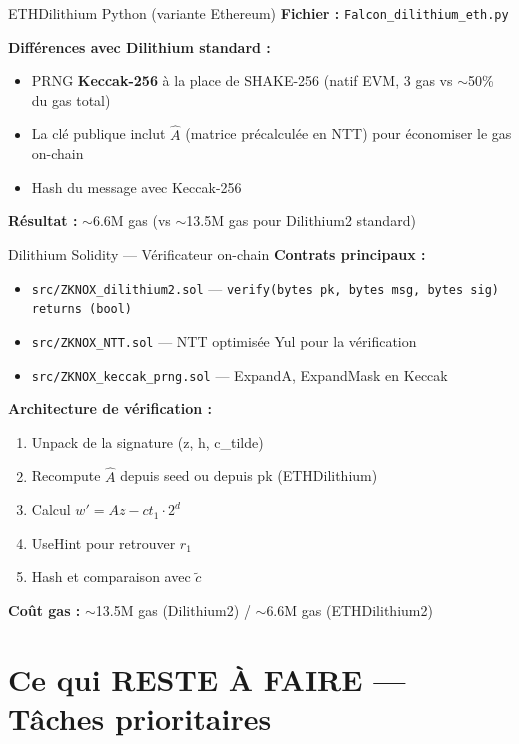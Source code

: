 \documentclass[12pt, a4paper]{article}
\begin{document}
\begin{done}{ETHDilithium Python (variante Ethereum)}
\textbf{Fichier :} \texttt{Falcon\_dilithium\_eth.py}

\textbf{Différences avec Dilithium standard :}
\begin{itemize}
  \item PRNG \textbf{Keccak-256} à la place de SHAKE-256 (natif EVM, 3 gas vs $\sim$50\% du gas total)
  \item La clé publique inclut $\hat{A}$ (matrice précalculée en NTT) pour économiser le gas on-chain
  \item Hash du message avec Keccak-256
\end{itemize}
\textbf{Résultat :} $\sim$6.6M gas (vs $\sim$13.5M gas pour Dilithium2 standard)
\end{done}

\begin{done}{Dilithium Solidity --- Vérificateur on-chain}
\textbf{Contrats principaux :}
\begin{itemize}
  \item \texttt{src/ZKNOX\_dilithium2.sol} --- \texttt{verify(bytes pk, bytes msg, bytes sig) returns (bool)}
  \item \texttt{src/ZKNOX\_NTT.sol} --- NTT optimisée Yul pour la vérification
  \item \texttt{src/ZKNOX\_keccak\_prng.sol} --- ExpandA, ExpandMask en Keccak
\end{itemize}
\textbf{Architecture de vérification :}
\begin{enumerate}
  \item Unpack de la signature (z, h, c\_tilde)
  \item Recompute $\hat{A}$ depuis seed ou depuis pk (ETHDilithium)
  \item Calcul $w' = Az - ct_1 \cdot 2^d$
  \item UseHint pour retrouver $r_1$
  \item Hash et comparaison avec $\tilde{c}$
\end{enumerate}
\textbf{Coût gas :} $\sim$13.5M gas (Dilithium2) / $\sim$6.6M gas (ETHDilithium2)
\end{done}

\newpage
\section{Ce qui RESTE À FAIRE --- Tâches prioritaires}
\end{document}
